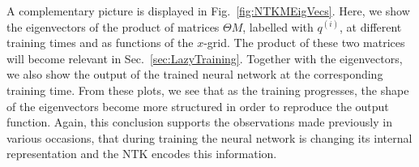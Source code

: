 A complementary picture is displayed in Fig.~\ref{fig:NTKMEigVecs}. Here, we
show the eigenvectors of the product of matrices $\Theta M$, labelled with
$q^{(i)}$, at different training times and as functions of the $x$-grid. The
product of these two matrices will become relevant in
Sec.~\ref{sec:LazyTraining}. Together with the eigenvectors, we also show the
output of the trained neural network at the corresponding training time. From
these plots, we see that as the training progresses, the shape of the eigenvectors
become more structured in order to reproduce the output function. Again, this
conclusion supports the observations made previously in various occasions, that
during training the neural network is changing its internal representation and
the NTK encodes this information.

\FloatBarrier
